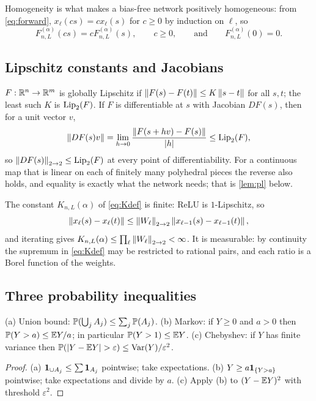 Homogeneity is what makes a bias-free network positively homogeneous: from \cref{eq:forward}, $x_\ell(cs)=cx_\ell(s)$ for $c\ge 0$ by induction on $\ell$, so
\begin{equation}\label{eq:homog}
F^{(\alpha)}_{n,L}(cs)=cF^{(\alpha)}_{n,L}(s),\qquad c\ge 0,\qquad\text{and}\qquad F^{(\alpha)}_{n,L}(0)=0.
\end{equation}

\subsection{Lipschitz constants and Jacobians}

$F:\mathbb{R}^n\to\mathbb{R}^m$ is globally Lipschitz if $\left\lVert F(s)-F(t)\right\rVert\le K\left\lVert s-t\right\rVert$ for all $s,t$; the least such $K$ is $\operatorname{Lip}_2(F)$. If $F$ is differentiable at $s$ with Jacobian $DF(s)$, then for a unit vector $v$,
\[
\left\lVert DF(s)v\right\rVert=\lim_{h\to 0}\frac{\left\lVert F(s+hv)-F(s)\right\rVert}{\left\lvert h\right\rvert}\le\operatorname{Lip}_2(F),
\]
so $\left\lVert DF(s)\right\rVert_{2\to 2}\le\operatorname{Lip}_2(F)$ at every point of differentiability. For a continuous map that is linear on each of finitely many polyhedral pieces the reverse also holds, and equality is exactly what the network needs; that is \cref{lem:pl} below.

The constant $K_{n,L}(\alpha)$ of \cref{eq:Kdef} is finite: ReLU is $1$-Lipschitz, so
\[
\left\lVert x_\ell(s)-x_\ell(t)\right\rVert\le\left\lVert W_\ell\right\rVert_{2\to 2}\left\lVert x_{\ell-1}(s)-x_{\ell-1}(t)\right\rVert,
\]
and iterating gives $K_{n,L}(\alpha)\le\prod_\ell\left\lVert W_\ell\right\rVert_{2\to 2}<\infty$. It is measurable: by continuity the supremum in \cref{eq:Kdef} may be restricted to rational pairs, and each ratio is a Borel function of the weights.

\subsection{Three probability inequalities}

\begin{lemma}\label{lem:prob}
(a) Union bound: $\mathbb{P}(\bigcup_j A_j)\le\sum_j\mathbb{P}(A_j)$. (b) Markov: if $Y\ge 0$ and $a>0$ then $\mathbb{P}(Y>a)\le\mathbb{E} Y/a$; in particular $\mathbb{P}(Y>1)\le\mathbb{E} Y$. (c) Chebyshev: if $Y$ has finite variance then $\mathbb{P}(\left\lvert Y-\mathbb{E} Y\right\rvert>\varepsilon)\le\operatorname{Var}(Y)/\varepsilon^2$.
\end{lemma}

\begin{proof}
(a) $\mathbf{1}_{\cup A_j}\le\sum\mathbf{1}_{A_j}$ pointwise; take expectations. (b) $Y\ge a\mathbf{1}_{\{Y>a\}}$ pointwise; take expectations and divide by $a$. (c) Apply (b) to $(Y-\mathbb{E} Y)^2$ with threshold $\varepsilon^2$.
\end{proof}

